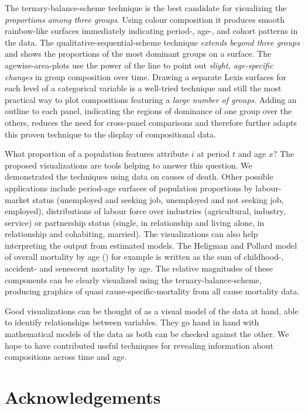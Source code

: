 \documentclass[parskip=half]{scrartcl}
\begin{document}
The ternary-balance-scheme technique is the best candidate for visualizing the \emph{proportions among three groups}. Using colour composition it produces smooth rainbow-like surfaces immediately indicating period-, age-, and cohort patterns in the data. The qualitative-sequential-scheme technique \emph{extends beyond three groups} and shows the proportions of the most dominant groups on a surface. The agewise-area-plots use the power of the line to point out \emph{slight, age-specific changes} in group composition over time. Drawing a separate Lexis surfaces for each level of a categorical variable is a well-tried technique and still the most practical way to plot compositions featuring a \emph{large number of groups}. Adding an outline to each panel, indicating the regions of dominance of one group over the others, reduces the need for cross-panel comparisons and therefore further adapts this proven technique to the display of compositional data.

What proportion of a population features attribute $i$ at period $t$ and age $x$? The proposed visualizations are tools helping to answer this question. We demonstrated the techniques using data on causes of death. Other possible applications include period-age surfaces of population proportions by labour-market status (unemployed and seeking job, unemployed and not seeking job, employed), distributions of labour force over industries (agricultural, industry, service) or partnership status (single, in relationship and living alone, in relationship and cohabiting, married). The visualizations can also help interpreting the output from estimated models. The Heligman and Pollard model of overall mortality by age (\cite{Heligman1980}) for example is written as the sum of childhood-, accident- and senescent mortality by age. The relative magnitudes of these components can be clearly visualized using the ternary-balance-scheme, producing graphics of quasi cause-specific-mortality from all cause mortality data.

Good visualizations can be thought of as a visual model of the data at hand, able to identify relationships between variables. They go hand in hand with mathematical models of the data as both can be checked against the other. We hope to have contributed useful techniques for revealing information about compositions across time and age.

\clearpage

\section{Acknowledgements} %
\label{sec:ack}
\end{document}
